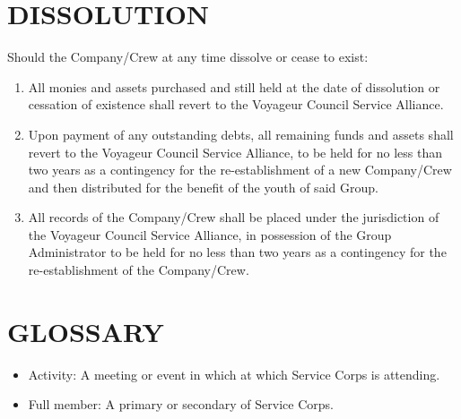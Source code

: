 \documentclass{Service_Corps_Document}
\begin{document}
\section{DISSOLUTION}
Should the Company/Crew at any time dissolve or cease to exist: 
\begin{enumerate}
	\item All monies and assets purchased and still held at the date of dissolution or cessation of existence shall revert to the Voyageur Council Service Alliance.
	\item Upon payment of any outstanding debts, all remaining funds and assets shall revert to the Voyageur Council Service Alliance, to be held for no less than two years as a contingency for the re-establishment of a new Company/Crew and then distributed for the benefit of the youth of said Group.
	\item All records of the Company/Crew shall be placed under the jurisdiction of the Voyageur Council Service Alliance, in possession of the Group Administrator to be held for no less than two years as a contingency for the re-establishment of the Company/Crew. 
\end{enumerate}
\section{GLOSSARY}
\begin{itemize}
	\item Activity: A meeting or event in which at which Service Corps is attending.
	\item Full member: A primary or secondary of  Service Corps.
\end{itemize}
\end{document}
